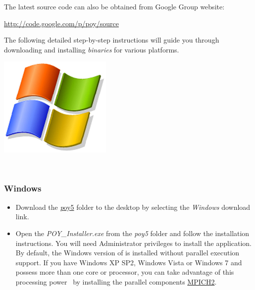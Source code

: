 The latest source code can also be obtained from \poy Google Group website:
\begin{center}
\url{http://code.google.com/p/poy/source}
\end{center}

The following detailed step-by-step instructions will guide you through downloading and installing 
\poy \emph{binaries} for various platforms.

\begin{flushleft}
	\begin{minipage}[c]{0.074\textwidth}
	   	\includegraphics[width=\textwidth]{doc/figures/figlogowindows.jpg}
	\end{minipage}
	\,
	\begin{minipage}[t]{0.88\textwidth}
		   	\subsubsection*{Windows}
	\end{minipage}
	
	
		\begin{itemize}
			\item
                Download the \href{http://research.amnh.org/scicomp/projects/poy.php}{\emph poy5} folder to the desktop by 
                selecting the \emph{Windows} download link.

			\item 
           Open the \emph{POY\_Installer.exe} from the \emph{poy5} folder and follow the installation instructions. 
           You will need Administrator privileges to install the application. 
           By default, the Windows version of \poy is installed without parallel execution support. If you have 
           Windows XP SP2, Windows Vista or Windows 7 and possess more than one core or processor, you 
           can take advantage of this processing power \ by installing the parallel components 
           \href{http://www-unix.mcs.anl.gov/mpi/}{MPICH2}. 
           

\end{itemize}
\end{flushleft}
